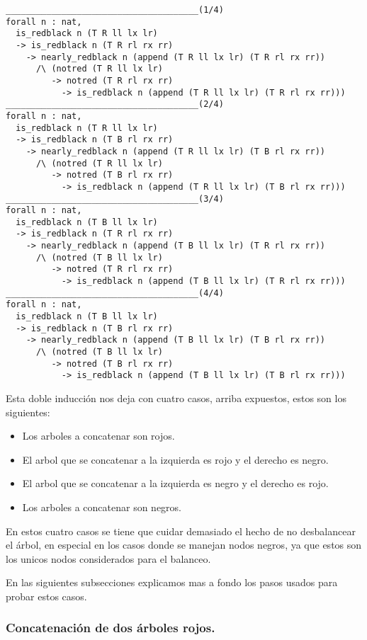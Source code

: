 \begin{verbatim}
______________________________________(1/4)
forall n : nat,
  is_redblack n (T R ll lx lr)
  -> is_redblack n (T R rl rx rr)
    -> nearly_redblack n (append (T R ll lx lr) (T R rl rx rr))
      /\ (notred (T R ll lx lr)
         -> notred (T R rl rx rr)
           -> is_redblack n (append (T R ll lx lr) (T R rl rx rr)))
______________________________________(2/4)
forall n : nat,
  is_redblack n (T R ll lx lr)
  -> is_redblack n (T B rl rx rr)
    -> nearly_redblack n (append (T R ll lx lr) (T B rl rx rr))
      /\ (notred (T R ll lx lr)
         -> notred (T B rl rx rr)
           -> is_redblack n (append (T R ll lx lr) (T B rl rx rr)))
______________________________________(3/4)
forall n : nat,
  is_redblack n (T B ll lx lr)
  -> is_redblack n (T R rl rx rr)
    -> nearly_redblack n (append (T B ll lx lr) (T R rl rx rr))
      /\ (notred (T B ll lx lr)
         -> notred (T R rl rx rr)
           -> is_redblack n (append (T B ll lx lr) (T R rl rx rr)))
______________________________________(4/4)
forall n : nat,
  is_redblack n (T B ll lx lr)
  -> is_redblack n (T B rl rx rr)
    -> nearly_redblack n (append (T B ll lx lr) (T B rl rx rr))
      /\ (notred (T B ll lx lr)
         -> notred (T B rl rx rr)
           -> is_redblack n (append (T B ll lx lr) (T B rl rx rr)))
\end{verbatim}

Esta doble inducci\'on nos deja con cuatro casos, arriba expuestos, estos son los siguientes:
\begin{itemize}
    \item Los arboles a concatenar son rojos.
    \item El arbol que se concatenar a la izquierda es rojo y el derecho es negro.
    \item El arbol que se concatenar a la izquierda es negro y el derecho es rojo.
    \item Los arboles a concatenar son negros.
\end{itemize}

En estos cuatro casos se tiene que cuidar demasiado el hecho de no desbalancear el \'arbol, en
especial en los casos donde se manejan nodos negros, ya que estos son los unicos nodos
considerados para el balanceo.

En las siguientes subsecciones explicamos mas a fondo los pasos usados para probar estos casos.


\subsubsection{Concatenaci\'on de dos \'arboles rojos.}

